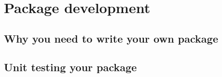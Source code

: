 \documentclass[]{gitbook}
\newenvironment{Shaded}{\begin{snugshade}}{\end{snugshade}}
\newcommand{\DecValTok}[1]{\textcolor[rgb]{0.00,0.00,0.81}{#1}}
\newcommand{\NormalTok}[1]{#1}
\newcommand{\OperatorTok}[1]{\textcolor[rgb]{0.81,0.36,0.00}{\textbf{#1}}}
\newcommand{\StringTok}[1]{\textcolor[rgb]{0.31,0.60,0.02}{#1}}
\theoremstyle{definition}
\theoremstyle{definition}
\theoremstyle{definition}
\theoremstyle{remark}
\begin{document}
\begin{Shaded}
\end{Shaded}

\hypertarget{package-development}{%
\section{Package development}\label{package-development}}

\hypertarget{why-you-need-to-write-your-own-package}{%
\subsection{Why you need to write your own
package}\label{why-you-need-to-write-your-own-package}}

\hypertarget{unit-testing-your-package}{%
\subsection{Unit testing your package}\label{unit-testing-your-package}}
\end{document}
